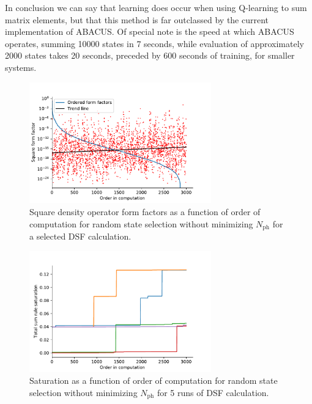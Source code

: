 \documentclass[11pt, a4paper]{report} %
\begin{document}
In conclusion we can say that learning does occur when using Q-learning to sum matrix elements, but that this method is far outclassed by the current implementation of ABACUS.\@
Of special note is the speed at which ABACUS operates, summing 10000 states in 7 seconds, while evaluation of approximately 2000 states takes 20 seconds, preceded by 600 seconds of training, for smaller systems.


\begin{figure}[tb!]
  \centering
  \includegraphics[width=0.7\textwidth]{ff_sizes_rand_True_check_train_False_check_eval_False.pdf}
  \caption{Square density operator form factors as a function of order of computation for random state selection without minimizing \(N_{\mathrm{ph}}\) for a selected DSF calculation.}\label{fig:ff_sizes_rand_True_check_train_False_check_eval_False}
\end{figure}

\begin{figure}[tb!]
  \centering
  \includegraphics[width=0.7\textwidth]{saturation_histories_rand_True_check_train_False_check_eval_False.pdf}
  \caption{Saturation as a function of order of computation for random state selection without minimizing \(N_{\mathrm{ph}}\) for 5 runs of DSF calculation.}\label{fig:saturation_rand_True_check_train_False_check_eval_False}
\end{figure}
\end{document}
